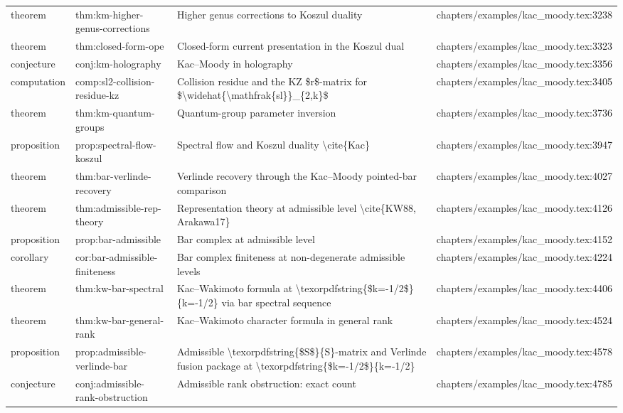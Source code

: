 \documentclass[11pt]{article}
\begin{document}
\begin{longtable}{L{0.10\textwidth}L{0.26\textwidth}L{0.42\textwidth}L{0.22\textwidth}}
theorem & thm:km-higher-genus-corrections & Higher genus corrections to Koszul duality & chapters/examples/kac\_moody.tex:3238\\
theorem & thm:closed-form-ope & Closed-form current presentation in the Koszul dual & chapters/examples/kac\_moody.tex:3323\\
conjecture & conj:km-holography & Kac--Moody in holography & chapters/examples/kac\_moody.tex:3356\\
computation & comp:sl2-collision-residue-kz & Collision residue and the KZ \$r\$-matrix for \$\textbackslash{}widehat\{\textbackslash{}mathfrak\{sl\}\}\_\{2,k\}\$ & chapters/examples/kac\_moody.tex:3405\\
theorem & thm:km-quantum-groups & Quantum-group parameter inversion & chapters/examples/kac\_moody.tex:3736\\
proposition & prop:spectral-flow-koszul & Spectral flow and Koszul duality \textbackslash{}cite\{Kac\} & chapters/examples/kac\_moody.tex:3947\\
theorem & thm:bar-verlinde-recovery & Verlinde recovery through the Kac--Moody pointed-bar comparison & chapters/examples/kac\_moody.tex:4027\\
theorem & thm:admissible-rep-theory & Representation theory at admissible level \textbackslash{}cite\{KW88, Arakawa17\} & chapters/examples/kac\_moody.tex:4126\\
proposition & prop:bar-admissible & Bar complex at admissible level & chapters/examples/kac\_moody.tex:4152\\
corollary & cor:bar-admissible-finiteness & Bar complex finiteness at non-degenerate admissible levels & chapters/examples/kac\_moody.tex:4224\\
theorem & thm:kw-bar-spectral & Kac--Wakimoto formula at \textbackslash{}texorpdfstring\{\$k=-1/2\$\}\{k=-1/2\} via bar spectral sequence & chapters/examples/kac\_moody.tex:4406\\
theorem & thm:kw-bar-general-rank & Kac--Wakimoto character formula in general rank & chapters/examples/kac\_moody.tex:4524\\
proposition & prop:admissible-verlinde-bar & Admissible \textbackslash{}texorpdfstring\{\$S\$\}\{S\}-matrix and Verlinde fusion package at \textbackslash{}texorpdfstring\{\$k=-1/2\$\}\{k=-1/2\} & chapters/examples/kac\_moody.tex:4578\\
conjecture & conj:admissible-rank-obstruction & Admissible rank obstruction: exact count & chapters/examples/kac\_moody.tex:4785\\

\end{longtable}
\end{document}
